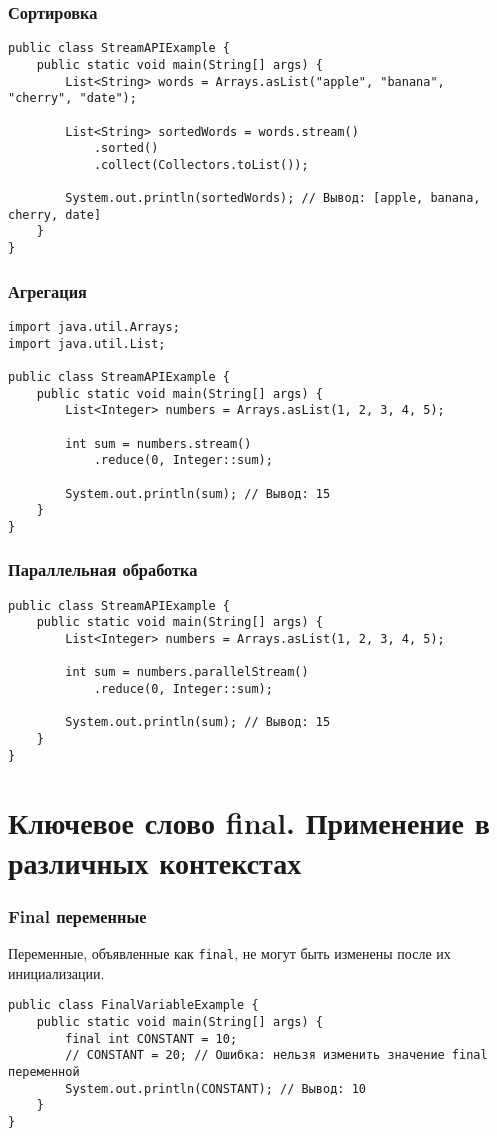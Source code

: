 \documentclass[12pt, a4paper]{article}
\begin{document}
\subsubsection*{Сортировка}
\begin{verbatim}
public class StreamAPIExample {
    public static void main(String[] args) {
        List<String> words = Arrays.asList("apple", "banana", "cherry", "date");

        List<String> sortedWords = words.stream()
            .sorted()
            .collect(Collectors.toList());

        System.out.println(sortedWords); // Вывод: [apple, banana, cherry, date]
    }
}
\end{verbatim}

\subsubsection*{Агрегация}
\begin{verbatim}
import java.util.Arrays;
import java.util.List;

public class StreamAPIExample {
    public static void main(String[] args) {
        List<Integer> numbers = Arrays.asList(1, 2, 3, 4, 5);

        int sum = numbers.stream()
            .reduce(0, Integer::sum);

        System.out.println(sum); // Вывод: 15
    }
}
\end{verbatim}

\subsubsection*{Параллельная обработка}
\begin{verbatim}
public class StreamAPIExample {
    public static void main(String[] args) {
        List<Integer> numbers = Arrays.asList(1, 2, 3, 4, 5);

        int sum = numbers.parallelStream()
            .reduce(0, Integer::sum);

        System.out.println(sum); // Вывод: 15
    }
}
\end{verbatim}


\section{Ключевое слово final. Применение в различных контекстах}
\subsubsection*{Final переменные}
Переменные, объявленные как \texttt{final}, не могут быть изменены после их инициализации.
\begin{verbatim}
public class FinalVariableExample {
    public static void main(String[] args) {
        final int CONSTANT = 10;
        // CONSTANT = 20; // Ошибка: нельзя изменить значение final переменной
        System.out.println(CONSTANT); // Вывод: 10
    }
}
\end{verbatim}
\end{document}
